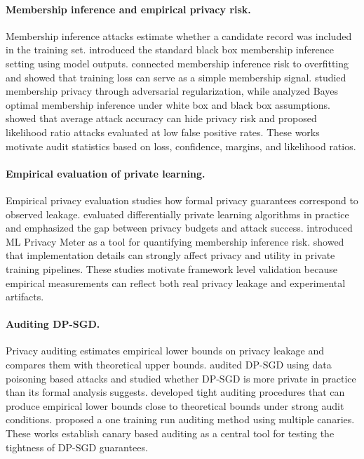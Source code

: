 \documentclass{article}
\begin{document}
\paragraph{Membership inference and empirical privacy risk.}
Membership inference attacks estimate whether a candidate record was included in the training set. \citet{shokri2017membership} introduced the standard black box membership inference setting using model outputs. \citet{yeom2018privacy} connected membership inference risk to overfitting and showed that training loss can serve as a simple membership signal. \citet{nasr2018machine} studied membership privacy through adversarial regularization, while \citet{sablayrolles2019white} analyzed Bayes optimal membership inference under white box and black box assumptions. \citet{carlini2022membership} showed that average attack accuracy can hide privacy risk and proposed likelihood ratio attacks evaluated at low false positive rates. These works motivate audit statistics based on loss, confidence, margins, and likelihood ratios.

\paragraph{Empirical evaluation of private learning.}
Empirical privacy evaluation studies how formal privacy guarantees correspond to observed leakage. \citet{jayaraman2019evaluating} evaluated differentially private learning algorithms in practice and emphasized the gap between privacy budgets and attack success. \citet{murakonda2020ml} introduced ML Privacy Meter as a tool for quantifying membership inference risk. \citet{tramer2022debugging} showed that implementation details can strongly affect privacy and utility in private training pipelines. These studies motivate framework level validation because empirical measurements can reflect both real privacy leakage and experimental artifacts.

\paragraph{Auditing DP-SGD.}
Privacy auditing estimates empirical lower bounds on privacy leakage and compares them with theoretical upper bounds. \citet{jagielski2020auditing} audited DP-SGD using data poisoning based attacks and studied whether DP-SGD is more private in practice than its formal analysis suggests. \citet{nasr2023tight} developed tight auditing procedures that can produce empirical lower bounds close to theoretical bounds under strong audit conditions. \citet{steinke2023privacy} proposed a one training run auditing method using multiple canaries. These works establish canary based auditing as a central tool for testing the tightness of DP-SGD guarantees.
\end{document}

